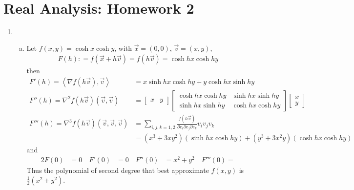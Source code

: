 \documentclass[a4paper,12pt]{article}
\theoremstyle{definition}
\begin{document}
\section*{Real Analysis: Homework 2}

\begin{enumerate}

\item 
\begin{enumerate}[(a)]
\item Let $f(x,y) = \cosh x \cosh y$, with $\vec{x} = (0,0)$, $\vec{v}=(x,y)$,
\begin{align*}
F(h): = f(\vec{x}+h\vec{v}) = f(h\vec{v}) = \cosh hx\cosh hy
\end{align*}
then
\begin{align*}
F'(h)=\left\langle\nabla f(h\vec{v}),\vec{v}\right\rangle  &= x \sinh hx \cosh hy + y \cosh hx \sinh hy\\
F''(h)=\nabla^2 f(h\vec{v})(\vec{v},\vec{v})&=\begin{bmatrix}x & y\end{bmatrix}\begin{bmatrix}\cosh hx \cosh hy & \sinh hx \sinh hy \\ \sinh hx \sinh hy &\cosh hx \cosh hy \end{bmatrix}\begin{bmatrix}x \\ y\end{bmatrix}\\
F'''(h)=\nabla^3 f(h\vec{v})(\vec{v},\vec{v},\vec{v}) &= \sum_{i,j,k=1,2}\frac{f(h\vec{v})}{\partial e_i\partial e_j\partial e_k}v_iv_jv_k \\
&= (x^3 + 3xy^2)(\sinh hx \cosh hy) + (y^3+3x^2y)(\cosh hx \cosh hy)
\end{align*}
and 
\begin{alignat*}{2}
F(0) &= 0 \quad F'(0) &= 0 \quad  F''(0) &= x^2 + y^2 \quad F'''(0) = 
\end{alignat*}
Thus the polynomial of second degree that best approximate $f(x,y)$ is $\frac{1}{2}(x^2+y^2)$.


\end{enumerate}
\end{enumerate}
\end{document}

